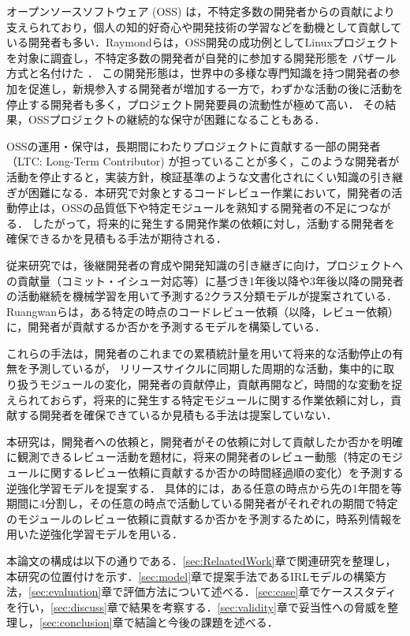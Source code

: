 \documentclass[submit,noauthor,ses,dvipdfmx]{ipsj}
\begin{document}
オープンソースソフトウェア (OSS) は，不特定多数の開発者からの貢献により支えられており，個人の知的好奇心や開発技術の学習などを動機として貢献している開発者も多い\cite{motivation}．Raymondらは，OSS開発の成功例としてLinuxプロジェクトを対象に調査し，不特定多数の開発者が自発的に参加する開発形態を バザール方式と名付けた \cite{bazzar}．
この開発形態は，世界中の多様な専門知識を持つ開発者の参加を促進し，新規参入する開発者が増加する一方で，わずかな活動の後に活動を停止する開発者も多く，プロジェクト開発要員の流動性が極めて高い\cite{dynamics}．
その結果，OSSプロジェクトの継続的な保守が困難になることもある\cite{pinto_otc}．

OSSの運用・保守は，長期間にわたりプロジェクトに貢献する一部の開発者（LTC: Long-Term Contributor) が担っていることが多く，このような開発者が活動を停止すると，実装方針，検証基準のような文書化されにくい知識の引き継ぎが困難になる．本研究で対象とするコードレビュー作業において，開発者の活動停止は，OSSの品質低下や特定モジュールを熟知する開発者の不足につながる\cite{bacchelli}\cite{mcintosh}．
したがって，将来的に発生する開発作業の依頼に対し，活動する開発者を確保できるかを見積もる手法が期待される．


従来研究では，後継開発者の育成や開発知識の引き継ぎに向け，プロジェクトへの貢献量（コミット・イシュー対応等）に基づき1年後以降や3年後以降の開発者の活動継続を機械学習を用いて予測する2クラス分類モデルが提案されている\cite{zhou}\cite{bao}\cite{constantinou}．Ruangwanらは，ある特定の時点のコードレビュー依頼（以降，レビュー依頼）に，開発者が貢献するか否かを予測するモデルを構築している\cite{shade}．

これらの手法は，開発者のこれまでの累積統計量を用いて将来的な活動停止の有無を予測しているが，
リリースサイクルに同期した周期的な活動，集中的に取り扱うモジュールの変化，開発者の貢献停止，貢献再開など，時間的な変動を捉えられておらず，将来的に発生する特定モジュールに関する作業依頼に対し，貢献する開発者を確保できているか見積もる手法は提案していない．

本研究は，開発者への依頼と，開発者がその依頼に対して貢献したか否かを明確に観測できるレビュー活動を題材に，将来の開発者のレビュー動態（特定のモジュールに関するレビュー依頼に貢献するか否かの時間経過順の変化）を予測する逆強化学習モデルを提案する． 具体的には，ある任意の時点から先の1年間を等期間に4分割し，その任意の時点で活動している開発者がそれぞれの期間で特定のモジュールのレビュー依頼に貢献するか否かを予測するために，時系列情報を用いた逆強化学習モデルを用いる．

本論文の構成は以下の通りである．\ref{sec:RelaatedWork}章で関連研究を整理し，本研究の位置付けを示す．\ref{sec:model}章で提案手法であるIRLモデルの構築方法，\ref{sec:evaluation}章で評価方法について述べる．\ref{sec:case}章でケーススタディを行い，\ref{sec:discuss}章で結果を考察する．\ref{sec:validity}章で妥当性への脅威を整理し，\ref{sec:conclusion}章で結論と今後の課題を述べる．
\end{document}
